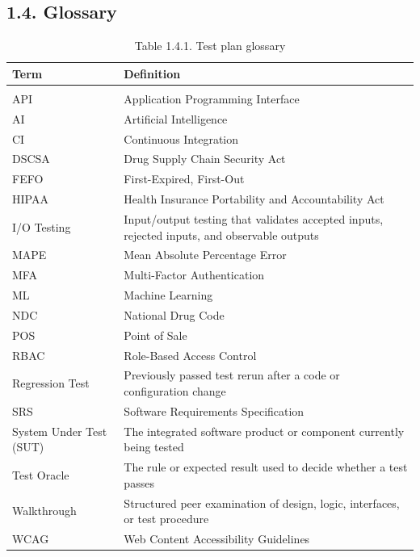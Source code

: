 \subsection{1.4. Glossary}\label{glossary}

{\def\LTcaptype{none} %
\begin{longtable}[]{|
  >{\raggedright\arraybackslash}m{}|
  >{\raggedright\arraybackslash}m{}|}
\hline
\begin{minipage}[c]{\linewidth}\raggedright
\textbf{Term}
\end{minipage} & \begin{minipage}[c]{\linewidth}\raggedright
\textbf{Definition}
\end{minipage} \\
\hline
\endhead

\caption*{Table 1.4.1. Test plan glossary}\\
\endlastfoot
API & Application Programming Interface \\ \hline
AI & Artificial Intelligence \\ \hline
CI & Continuous Integration \\ \hline
DSCSA & Drug Supply Chain Security Act \\ \hline
FEFO & First-Expired, First-Out \\ \hline
HIPAA & Health Insurance Portability and Accountability Act \\ \hline
I/O Testing & Input/output testing that validates accepted inputs, rejected inputs, and observable outputs \\ \hline
MAPE & Mean Absolute Percentage Error \\ \hline
MFA & Multi-Factor Authentication \\ \hline
ML & Machine Learning \\ \hline
NDC & National Drug Code \\ \hline
POS & Point of Sale \\ \hline
RBAC & Role-Based Access Control \\ \hline
Regression Test & Previously passed test rerun after a code or configuration change \\ \hline
SRS & Software Requirements Specification \\ \hline
System Under Test (SUT) & The integrated software product or component currently being tested \\ \hline
Test Oracle & The rule or expected result used to decide whether a test passes \\ \hline
Walkthrough & Structured peer examination of design, logic, interfaces, or test procedure \\ \hline
WCAG & Web Content Accessibility Guidelines \\ \hline
\end{longtable}
}

